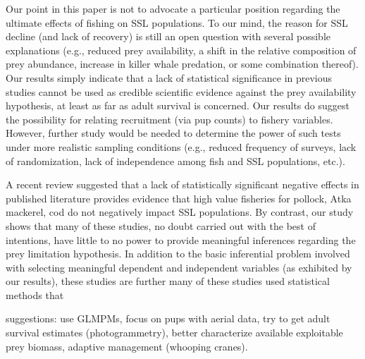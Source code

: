 \documentclass[nonumbib,leqno]{nrc1}
\begin{document}
Our point in this paper is not to advocate a particular position regarding the ultimate effects of fishing on SSL populations.  To our mind, the reason for SSL decline (and lack of recovery) is still an open question with several possible explanations (e.g., reduced prey availability, a shift in the relative composition of prey abundance, increase in killer whale predation, or some combination thereof).  Our results simply indicate that a lack of statistical significance in previous studies cannot be used as credible scientific evidence against the prey availability hypothesis, at least as far as adult survival is concerned.  Our results do suggest the possibility for relating recruitment (via pup counts) to fishery variables.  However, further study would be needed to determine the power of such tests under more realistic sampling conditions (e.g., reduced frequency of surveys, lack of randomization, lack of independence among fish and SSL populations, etc.).

A recent review \citep{Bernard:2011dq} suggested that a lack of statistically significant negative effects in published literature provides evidence that high value fisheries for pollock, Atka mackerel, cod do not negatively impact SSL populations.  By contrast, our study shows that many of these studies, no doubt carried out with the best of intentions, have little to no power to provide meaningful inferences regarding the prey limitation hypothesis.  In addition to the basic inferential problem involved with selecting meaningful dependent and independent variables (as exhibited by our results), these studies are further many of these studies used statistical methods that

suggestions: use GLMPMs, focus on pups with aerial data, try to get adult survival estimates (photogrammetry), better characterize available exploitable prey biomass, adaptive management (whooping cranes).



\end{document}
